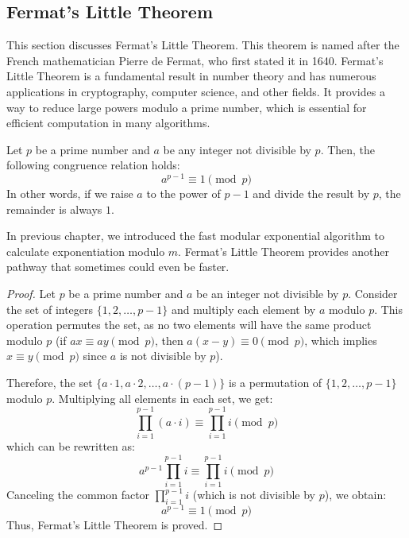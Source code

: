         \subsection{Fermat's Little Theorem}
        This section discusses Fermat's Little Theorem. This theorem is named after the French mathematician Pierre de Fermat, who first stated it in 1640. 
        Fermat's Little Theorem is a fundamental result in number theory and has numerous applications in cryptography, computer science, and other fields.
        It provides a way to reduce large powers modulo a prime number, which is essential for efficient computation in many algorithms.
        \begin{theorem}
            Let $p$ be a prime number and $a$ be any integer not divisible by $p$. Then, the following congruence relation holds:
            \[a^{p-1} \equiv 1 \pmod{p}\]
            In other words, if we raise $a$ to the power of $p-1$ and divide the result by $p$, the remainder is always $1$. 
        \end{theorem}
        In previous chapter, we introduced the fast modular exponential algorithm to calculate exponentiation modulo $m$. Fermat's Little Theorem
        provides another pathway that sometimes could even be faster.
        \begin{proof}
            Let $p$ be a prime number and $a$ be an integer not divisible by $p$. Consider the set of integers $\{1, 2, \ldots, p-1\}$ and multiply each element by $a$ modulo $p$. This operation permutes the set, as no two elements will have the same product modulo $p$ (if $ax \equiv ay \pmod{p}$, then $a(x-y) \equiv 0 \pmod{p}$, which implies $x \equiv y \pmod{p}$ since $a$ is not divisible by $p$).
            
            Therefore, the set $\{a \cdot 1, a \cdot 2, \ldots, a \cdot (p-1)\}$ is a permutation of $\{1, 2, \ldots, p-1\}$ modulo $p$. Multiplying all elements in each set, we get:
            \[
            \prod_{i=1}^{p-1} (a \cdot i) \equiv \prod_{i=1}^{p-1} i \pmod{p}
            \]
            which can be rewritten as:
            \[
            a^{p-1} \prod_{i=1}^{p-1} i \equiv \prod_{i=1}^{p-1} i \pmod{p}
            \]
            Canceling the common factor $\prod_{i=1}^{p-1} i$ (which is not divisible by $p$), we obtain:
            \[
            a^{p-1} \equiv 1 \pmod{p}
            \]
            Thus, Fermat's Little Theorem is proved.
        \end{proof}

